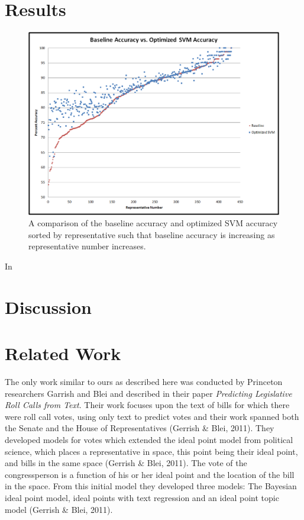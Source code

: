 \documentclass[11pt,letterpaper,twocolumn]{article}
\begin{document}
\section{Results}

\begin{figure}
\includegraphics[width=6.5in]{accuracy_comparison.png}
\caption{A comparison of the baseline accuracy and optimized SVM accuracy sorted by representative such that baseline accuracy is increasing as representative number increases.}
\end{figure}
In

\section{Discussion}

\section{Related Work}

The only work similar to ours as described here was conducted by Princeton researchers Garrish and Blei and described in their paper \textit{Predicting Legislative Roll Calls from Text}. Their work focuses upon the text of bills for which there were roll call votes, using only text to predict votes and their work spanned both the Senate and the House of Representatives (Gerrish \& Blei, 2011). They developed models for votes which extended the ideal point model from political science, which places a representative in space, this point being their ideal point, and bills in the same space (Gerrish \& Blei, 2011). The vote of the congressperson is a function of his or her ideal point and the location of the bill in the space. From this initial model they developed three models: The Bayesian ideal point model, ideal points with text regression and an ideal point topic model (Gerrish \& Blei, 2011). 
\end{document}
